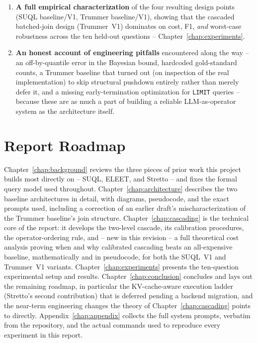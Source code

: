 \begin{enumerate}
  \item \textbf{A full empirical characterization} of the four resulting
        design points (SUQL baseline/V1, Trummer baseline/V1), showing
        that the cascaded batched-join design (Trummer~V1) dominates on
        cost, F1, \emph{and} worst-case robustness across the ten
        held-out questions -- Chapter~\ref{chap:experiments}.
  \item \textbf{An honest account of engineering pitfalls} encountered
        along the way -- an off-by-quantile error in the Bayesian bound,
        hardcoded gold-standard counts, a Trummer baseline that turned
        out (on inspection of the real implementation) to skip
        structural pushdown entirely rather than merely defer it, and a
        missing early-termination optimization for \texttt{LIMIT}
        queries -- because these are as much a part of building a
        reliable LLM-as-operator system as the architecture itself.
\end{enumerate}

\section{Report Roadmap}

Chapter~\ref{chap:background} reviews the three pieces of prior work this
project builds most directly on -- SUQL, ELEET, and Stretto -- and fixes
the formal query model used throughout. Chapter~\ref{chap:architecture}
describes the two baseline architectures in detail, with diagrams,
pseudocode, and the exact prompts used, including a correction of an
earlier draft's mischaracterization of the Trummer baseline's join
structure. Chapter~\ref{chap:cascading} is the technical core of the
report: it develops the two-level cascade, its calibration procedures,
the operator-ordering rule, and -- new in this revision -- a full
theoretical cost analysis proving when and why calibrated cascading
beats an all-expensive baseline, mathematically and in pseudocode, for
both the SUQL~V1 and Trummer~V1 variants. Chapter~\ref{chap:experiments}
presents the ten-question experimental setup and results.
Chapter~\ref{chap:conclusion} concludes and lays out the remaining
roadmap, in particular the KV-cache-aware execution ladder (Stretto's
second contribution) that is deferred pending a backend migration, and
the near-term engineering changes the theory of
Chapter~\ref{chap:cascading} points to directly. Appendix~\ref{chap:appendix}
collects the full system prompts, verbatim from the repository, and the
actual commands used to reproduce every experiment in this report.
